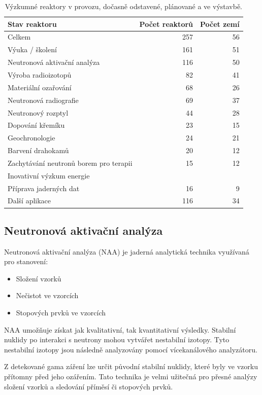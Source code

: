 \begin{table}[h!]
\centering
\caption{Výzkumné reaktory v provozu, dočasně odstavené, plánované a ve výstavbě.}
\begin{tabular}{lrr}
\toprule
Stav reaktoru & Počet reaktorů & Počet zemí \\
\midrule
Celkem & 257 & 56 \\
Výuka / školení & 161 & 51 \\
Neutronová aktivační analýza & 116 & 50 \\
Výroba radioizotopů & 82 & 41 \\
Materiální ozařování & 68 & 26 \\
Neutronová radiografie & 69 & 37 \\
Neutronový rozptyl & 44 & 28 \\
Dopování křemíku & 23 & 15 \\
Geochronologie & 24 & 21 \\
Barvení drahokamů & 20 & 12 \\
Zachytávání neutronů borem pro terapii & 15 & 12 \\
Inovativní výzkum energie &  &  \\
Příprava jaderných dat & 16 & 9 \\
Další aplikace & 116 & 34 \\
\bottomrule
\end{tabular}
\end{table}

\subsection{Neutronová aktivační analýza}

Neutronová aktivační analýza (NAA) je jaderná analytická technika využívaná pro stanovení:

\begin{itemize}
    \item Složení vzorků
    \item Nečistot ve vzorcích
    \item Stopových prvků ve vzorcích
\end{itemize}

NAA umožňuje získat jak kvalitativní, tak kvantitativní výsledky. Stabilní nuklidy po interakci s neutrony mohou vytvářet nestabilní izotopy. Tyto nestabilní izotopy jsou následně analyzovány pomocí vícekanálového analyzátoru. 

Z detekované gama záření lze určit původní stabilní nuklidy, které byly ve vzorku přítomny před jeho ozářením. Tato technika je velmi užitečná pro přesné analýzy složení vzorků a sledování příměsí či stopových prvků.


